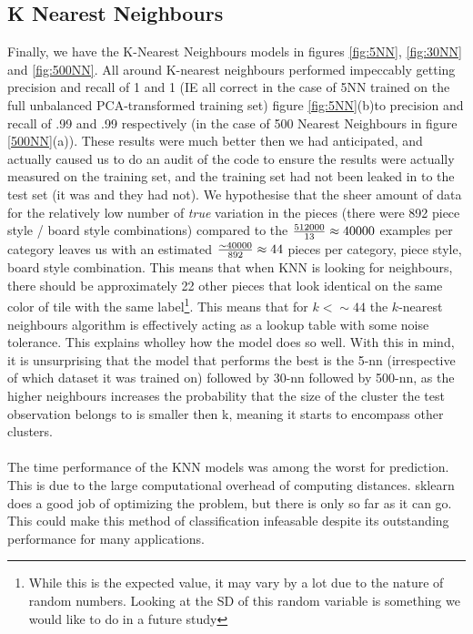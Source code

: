 \documentclass{article}
\newcommand{\PCAF}{(b)}
\newcommand{\NMFB}{(a)}
\begin{document}
\begin{multicols}{2}
\subsection{K Nearest Neighbours}
Finally, we have the K-Nearest Neighbours models in figures \ref{fig:5NN}, \ref{fig:30NN} and \ref{fig:500NN}. All around K-nearest neighbours performed impeccably getting precision and recall of 1 and 1 (IE all correct in the case of 5NN trained on the full unbalanced PCA-transformed training set) figure \ref{fig:5NN}\PCAF to precision and recall of .99 and .99 respectively (in the case of 500 Nearest Neighbours in figure \ref{500NN}\NMFB).
These results were much better then we had anticipated, and actually caused us to do an audit of the code to ensure the results were actually measured on the training set, and the training set had not been leaked in to the test set (it was and they had not).
We hypothesise that the sheer amount of data for the relatively low number of \emph{true} variation in the pieces (there were 892 piece style / board style combinations) compared to the ${512000 \over 13} \approx 40000$ examples per category leaves us with an estimated ${\sim40000 \over 892} \approx 44$ pieces per category, piece style, board style combination. This means that when KNN is looking for neighbours, there should be approximately 22 other pieces that look identical on the same color of tile with the same label\footnote{While this is the expected value, it may vary by a lot due to the nature of random numbers. Looking at the SD of this random variable is something we would like to do in a future study}. This means that for $k < \sim 44$ the $k$-nearest neighbours algorithm is effectively acting as a lookup table with some noise tolerance. This explains wholley how the model does so well. With this in mind, it is unsurprising that the model that performs the best is the 5-nn (irrespective of which dataset it was trained on) followed by 30-nn followed by 500-nn, as the higher neighbours increases the probability that the size of the cluster the test observation belongs to is smaller then k, meaning it starts to encompass other clusters.
\\\\
The time performance of the KNN models was among the worst for prediction. This is due to the large computational overhead of computing distances. sklearn does a good job of optimizing the problem, but there is only so far as it can go. This could make this method of classification infeasable despite its outstanding performance for many applications.

\end{multicols}
\end{document}
